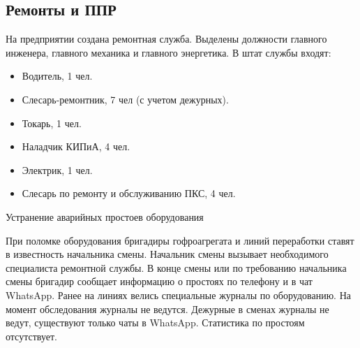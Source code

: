 


\newpage
\subsection{Ремонты и ППР}
\label{bp:maintance}


На предприятии создана ремонтная служба. Выделены должности главного инженера, главного механика и главного энергетика. В штат службы входят:
\begin{itemize}
    \item  Водитель, 1 чел.
    \item Слесарь-ремонтник, 7 чел (с учетом дежурных). 
    \item Токарь, 1 чел.
    \item Наладчик КИПиА, 4 чел.
    \item Электрик, 1 чел.
    \item Слесарь по ремонту и обслуживанию ПКС, 4 чел.
\end{itemize}

Устранение аварийных простоев оборудования

При поломке оборудования бригадиры гофроагрегата и линий переработки ставят в известность начальника смены. Начальник смены вызывает необходимого специалиста ремонтной службы. В конце смены или по требованию начальника смены бригадир сообщает информацию о простоях по телефону и в чат WhatsApp. Ранее на линиях велись специальные журналы по оборудованию. На момент обследования журналы не ведутся. Дежурные в сменах журналы не ведут, существуют только чаты в WhatsApp. Статистика по простоям отсутствует.    





